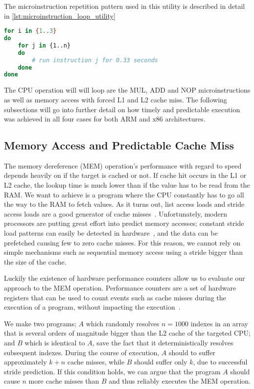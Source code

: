 The microinstruction repetition pattern used in this utility is described in detail in \autoref{lst:microinstruction_loop_utility}

\begin{lstlisting}[language=BASH, caption={Mapping execution to the time domain: Microinstruction loop utility.}, label={lst:microinstruction_loop_utility}]
for i in {1..3}
do
	for j in {1..n}
	do
		# run instruction j for 0.33 seconds
	done
done
\end{lstlisting}

The CPU operation will will loop are the MUL, ADD and NOP microinstructions as well as memory access with forced L1 and L2 cache miss. 
The following subsections will go into further detail on how timely and predictable execution was achieved in all four cases for both ARM and x86 architectures.

\subsection{Memory Access and Predictable Cache Miss}
\label{chp4:subsec:MEM_operation}

The memory dereference (MEM) operation's performance with regard to speed depends heavily on if the target is cached or not. 
If cache hit occurs in the L1 or L2 cache, the lookup time is much lower than if the value has to be read from the RAM.
We want to achieve is a program where the CPU constantly has to go all the way to the RAM to fetch values.
As it turns out, list access loads and stride access loads are a good generator of cache misses~\cite{DBLP:conf/micro/OzawaKN95}.
Unfortunately, modern processors are putting great effort into predict memory accesses; constant stride load patterns can easily be detected in hardware~\cite{DBLP:journals/taco/LeeKV12}, and the data can be prefetched causing few to zero cache misses.
For this reason, we cannot rely on simple mechanisms such as sequential memory access using a stride bigger than the size of the cache.

Luckily the existence of hardware performance counters allow us to evaluate our approach to the MEM operation. Performance counters are a set of hardware registers that can be used to count events such as cache misses during the execution of a program, without impacting the execution~\cite{url:perf_wiki}.

We make two programs; \(A\) which randomly resolves \(n = 1000\) indexes in an array that is several orders of magnitude bigger than the L2 cache of the targeted CPU; and \(B\) which is identical to \(A\), save the fact that it deterministically resolves subsequent indexes.
During the course of execution, \(A\) should to suffer approximately \(k+n\) cache misses, while \(B\) should suffer only \(k\), due to successful stride prediction. 
If this condition holds, we can argue that the program \(A\) should cause \(n\) more cache misses than \(B\) and thus reliably executes the MEM operation. 

